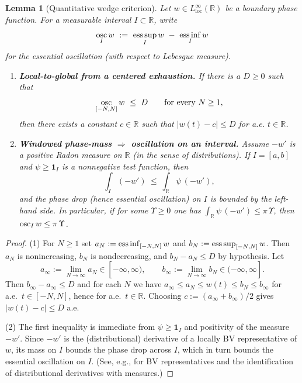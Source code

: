\documentclass[11pt]{article}
\newtheorem{lemma}[theorem]{Lemma}
\theoremstyle{definition}
\theoremstyle{remark}
\theoremstyle{definition}
\newcommand{\R}{\mathbb{R}}
\DeclareMathOperator{\osc}{osc}
\DeclareMathOperator*{\esssup}{ess\,sup}
\DeclareMathOperator*{\essinf}{ess\,inf}
\begin{document}
\begin{lemma}[Quantitative wedge criterion]\label{lem:local-to-global-wedge}
Let $w\in L^\infty_{\mathrm{loc}}(\R)$ be a boundary phase function. For a measurable interval $I\subset\R$, write
\[
  \osc\sb{I} w\ :=\ \esssup\sb{I} w\ -\ \essinf\sb{I} w
\]
for the essential oscillation (with respect to Lebesgue measure).
\begin{enumerate}
    \item \textbf{Local-to-global from a centered exhaustion.} If there is a $D\ge 0$ such that
    \[
      \osc\sb{[-N,N]} w\ \le\ D\qquad\text{for every }N\ge 1,
    \]
    then there exists a constant $c\in\R$ such that $|w(t)-c|\le D$ for a.e. $t\in\R$.
    \item \textbf{Windowed phase-mass $\Rightarrow$ oscillation on an interval.} Assume $-w'$ is a positive Radon measure on $\R$ (in the sense of distributions). If $I=[a,b]$ and $\psi\ge \mathbf 1_I$ is a nonnegative test function, then
    \[
      \int_I (-w')\ \le\ \int_{\R}\psi\,(-w'),
    \]
    and the phase drop (hence essential oscillation) on $I$ is bounded by the left-hand side. In particular, if for some $\Upsilon\ge 0$ one has $\int_{\R}\psi\,(-w')\le \pi\,\Upsilon$, then $\osc\sb{I} w\le \pi\,\Upsilon$.
\end{enumerate}
\end{lemma}
\begin{proof}
(1) For $N\ge 1$ set $a_N:=\essinf\sb{[-N,N]} w$ and $b_N:=\esssup\sb{[-N,N]} w$. Then $a_N$ is nonincreasing, $b_N$ is nondecreasing, and $b_N-a_N\le D$ by hypothesis. Let
\[
  a_\infty:=\lim_{N\to\infty} a_N\in[-\infty,\infty),\qquad b_\infty:=\lim_{N\to\infty} b_N\in(-\infty,\infty].
\]
Then $b_\infty-a_\infty\le D$ and for each $N$ we have $a_\infty\le a_N\le w(t)\le b_N\le b_\infty$ for a.e.\ $t\in[-N,N]$, hence for a.e.\ $t\in\R$. Choosing $c:=(a_\infty+b_\infty)/2$ gives $|w(t)-c|\le D$ a.e.

(2) The first inequality is immediate from $\psi\ge\mathbf 1_I$ and positivity of the measure $-w'$. Since $-w'$ is the (distributional) derivative of a locally BV representative of $w$, its mass on $I$ bounds the phase drop across $I$, which in turn bounds the essential oscillation on $I$. (See, e.g., \cite[Ch.~3]{AmbrosioFuscoPallara} for BV representatives and the identification of distributional derivatives with measures.)
\end{proof}
\end{document}
